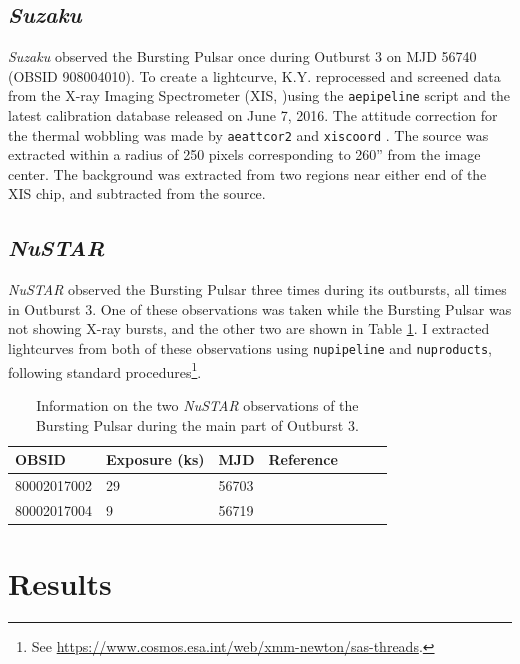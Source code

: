 \subsection{\textit{Suzaku}}
\par \textit{Suzaku} observed the Bursting Pulsar once during Outburst 3 on MJD 56740 (OBSID 908004010).  To create a lightcurve, \textsf{K.Y.} reprocessed and screened data from the X-ray Imaging Spectrometer (XIS, \citealp{Koyama_XIS})using the \texttt{aepipeline} script and the latest calibration database released on June 7, 2016.  The attitude correction for the thermal wobbling was made by \texttt{aeattcor2} and \texttt{xiscoord} \citep{Uchiyama_SuzPSF}. The source was extracted within a radius of 250 pixels corresponding to 260'' from the image center.  The background was extracted from two regions near either end of the XIS chip, and subtracted from the source.

\subsection{\textit{NuSTAR}}

\par \textit{NuSTAR} observed the Bursting Pulsar three times during its outbursts, all times in Outburst 3.  One of these observations was taken while the Bursting Pulsar was not showing X-ray bursts, and the other two are shown in Table \ref{tab:NuS}.  I extracted lightcurves from both of these observations using \texttt{nupipeline} and \texttt{nuproducts}, following standard procedures\footnote{See \url{https://www.cosmos.esa.int/web/xmm-newton/sas-threads}.}.

\begin{table}
\centering
\begin{tabular}{lllllll}
\hline
\hline
\scriptsize  OBSID &\scriptsize Exposure (ks) &\scriptsize MJD &\scriptsize Reference \\
\hline
80002017002 	& 29 & 56703 &  \citet{Dai_Hlags}  \\
80002017004 	& 9 & 56719 & \citet{Younes_Expo}\\
\hline
\hline
\end{tabular}
\caption[Information on two \textit{NuSTAR} observations of the Bursting Pulsar.]{Information on the two \textit{NuSTAR} observations of the Bursting Pulsar during the main part of Outburst 3.}
\label{tab:NuS}
\end{table}

\section{Results}
\label{sec:Results}

